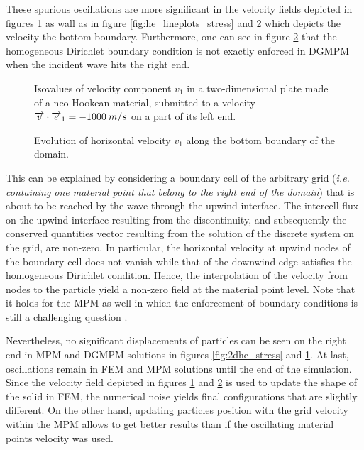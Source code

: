These spurious oscillations are more significant in the velocity fields depicted in figures \ref{fig:2dhe_velo} as wall as in figure \ref{fig:he_lineplots_stress} and \ref{fig:he_lineplots_velo} which depicts the velocity the bottom boundary.
Furthermore, one can see in figure \ref{fig:he_lineplots_velo} that the homogeneous Dirichlet boundary condition is not exactly enforced in DGMPM when the incident wave hits the right end.
\begin{figure}[h!]
  \centering
  
  \caption{Isovalues of velocity component $v_1$ in a two-dimensional plate made of a neo-Hookean material, submitted to a velocity ${\overrightarrow{v}}\cdot{\overrightarrow{e}}_1=-1000 \: m/s$ on a part of its left end.}
  \label{fig:2dhe_velo}
\end{figure}
\begin{figure}[h!]
  \centering
  { \label{subfig:he_velo1}}
  { \label{subfig:he_velo2}}
  { \label{subfig:he_velo3}}
  
  \caption{Evolution of horizontal velocity $v_1$ along the bottom boundary of the domain.}
  \label{fig:he_lineplots_velo}
\end{figure}
This can be explained by considering a boundary cell of the arbitrary grid (\textit{i.e. containing one material point that belong to the right end of the domain}) that is about to be reached by the wave through the upwind interface.
The intercell flux on the upwind interface resulting from the discontinuity, and subsequently the conserved quantities vector resulting from the solution of the discrete system on the grid, are non-zero.
In particular, the horizontal velocity at upwind nodes of the boundary cell does not vanish while that of the downwind edge satisfies the homogeneous Dirichlet condition. 
Hence, the interpolation of the velocity from nodes to the particle yield a non-zero field at the material point level.
Note that it holds for the MPM as well in which the enforcement of boundary conditions is still a challenging question \cite{BC_MPM}.

Nevertheless, no significant displacements of particles can be seen on the right end in MPM and DGMPM solutions in figures \ref{fig:2dhe_stress} and \ref{fig:2dhe_velo}.
At last, oscillations remain in FEM and MPM solutions until the end of the simulation. 
Since the velocity field depicted in figures \ref{fig:2dhe_velo} and \ref{fig:he_lineplots_velo} is used to update the shape of the solid in FEM, the numerical noise yields final configurations that are slightly different.
On the other hand, updating particles position with the grid velocity within the MPM allows to get better results than if the oscillating material points velocity was used.


